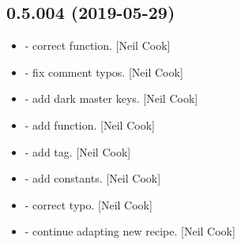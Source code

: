 \documentclass[a4paper,10pt,english]{report}
\begin{document}
\subsection{0.5.004 (2019-05-29)}
\label{\detokenize{misc/changelog:id133}}\begin{itemize}
\item {} 
 - correct  function. {[}Neil Cook{]}

\item {} 
 - fix comment typos. {[}Neil Cook{]}

\item {} 
 - add dark master keys. {[}Neil Cook{]}

\item {} 
 - add  function. {[}Neil Cook{]}

\item {} 
 - add  tag. {[}Neil Cook{]}

\item {} 
 - add  constants. {[}Neil Cook{]}

\item {} 
 - correct typo. {[}Neil Cook{]}

\item {} 
 - continue adapting new recipe. {[}Neil Cook{]}

\end{itemize}
\end{document}
